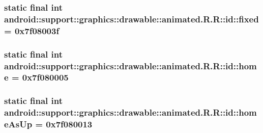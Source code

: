 \hypertarget{classandroid_1_1support_1_1graphics_1_1drawable_1_1animated_1_1_r_1_1id_85d5a64faecf84b9abe0bc36dbe0c7e3}{
\subsubsection[{fixed}]{\setlength{\rightskip}{0pt plus 5cm}static final int android::support::graphics::drawable::animated.R.R::id::fixed = 0x7f08003f}}
\label{classandroid_1_1support_1_1graphics_1_1drawable_1_1animated_1_1_r_1_1id_85d5a64faecf84b9abe0bc36dbe0c7e3}


\hypertarget{classandroid_1_1support_1_1graphics_1_1drawable_1_1animated_1_1_r_1_1id_d0d6b95eaf71e874952ee593f75db164}{
\subsubsection[{home}]{\setlength{\rightskip}{0pt plus 5cm}static final int android::support::graphics::drawable::animated.R.R::id::home = 0x7f080005}}
\label{classandroid_1_1support_1_1graphics_1_1drawable_1_1animated_1_1_r_1_1id_d0d6b95eaf71e874952ee593f75db164}


\hypertarget{classandroid_1_1support_1_1graphics_1_1drawable_1_1animated_1_1_r_1_1id_a97af371114c6a1594a30b18a2c99d0a}{
\subsubsection[{homeAsUp}]{\setlength{\rightskip}{0pt plus 5cm}static final int android::support::graphics::drawable::animated.R.R::id::homeAsUp = 0x7f080013}}
\label{classandroid_1_1support_1_1graphics_1_1drawable_1_1animated_1_1_r_1_1id_a97af371114c6a1594a30b18a2c99d0a}


